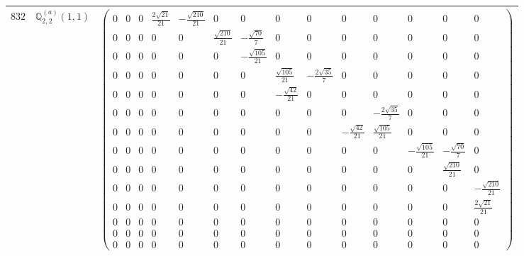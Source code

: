 \documentclass[fleqn,8pt,landscape]{jsarticle}
\begin{document}
\begin{center}
\begin{longtable}{ccc}
$ 832 $ & $ \mathbb{Q}_{2,2}^{(a)}(1,1) $ & $ \begin{pmatrix} 0 & 0 & 0 & \frac{2 \sqrt{21}}{21} & - \frac{\sqrt{210}}{21} & 0 & 0 & 0 & 0 & 0 & 0 & 0 & 0 & 0 \\ 0 & 0 & 0 & 0 & 0 & \frac{\sqrt{210}}{21} & - \frac{\sqrt{70}}{7} & 0 & 0 & 0 & 0 & 0 & 0 & 0 \\ 0 & 0 & 0 & 0 & 0 & 0 & - \frac{\sqrt{105}}{21} & 0 & 0 & 0 & 0 & 0 & 0 & 0 \\ 0 & 0 & 0 & 0 & 0 & 0 & 0 & \frac{\sqrt{105}}{21} & - \frac{2 \sqrt{35}}{7} & 0 & 0 & 0 & 0 & 0 \\ 0 & 0 & 0 & 0 & 0 & 0 & 0 & - \frac{\sqrt{42}}{21} & 0 & 0 & 0 & 0 & 0 & 0 \\ 0 & 0 & 0 & 0 & 0 & 0 & 0 & 0 & 0 & 0 & - \frac{2 \sqrt{35}}{7} & 0 & 0 & 0 \\ 0 & 0 & 0 & 0 & 0 & 0 & 0 & 0 & 0 & - \frac{\sqrt{42}}{21} & \frac{\sqrt{105}}{21} & 0 & 0 & 0 \\ 0 & 0 & 0 & 0 & 0 & 0 & 0 & 0 & 0 & 0 & 0 & - \frac{\sqrt{105}}{21} & - \frac{\sqrt{70}}{7} & 0 \\ 0 & 0 & 0 & 0 & 0 & 0 & 0 & 0 & 0 & 0 & 0 & 0 & \frac{\sqrt{210}}{21} & 0 \\ 0 & 0 & 0 & 0 & 0 & 0 & 0 & 0 & 0 & 0 & 0 & 0 & 0 & - \frac{\sqrt{210}}{21} \\ 0 & 0 & 0 & 0 & 0 & 0 & 0 & 0 & 0 & 0 & 0 & 0 & 0 & \frac{2 \sqrt{21}}{21} \\ 0 & 0 & 0 & 0 & 0 & 0 & 0 & 0 & 0 & 0 & 0 & 0 & 0 & 0 \\ 0 & 0 & 0 & 0 & 0 & 0 & 0 & 0 & 0 & 0 & 0 & 0 & 0 & 0 \\ 0 & 0 & 0 & 0 & 0 & 0 & 0 & 0 & 0 & 0 & 0 & 0 & 0 & 0 \end{pmatrix} $ \\ \hline

\end{longtable}
\end{center}
\end{document}
